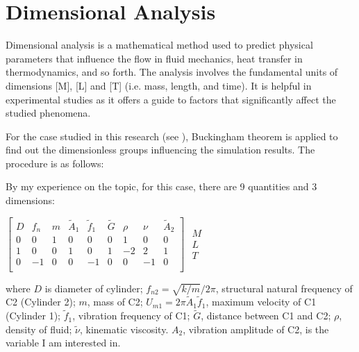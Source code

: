 
\section{Dimensional Analysis} \label{sec:nondim}

	

Dimensional analysis is a mathematical method used to predict physical parameters that influence the flow in fluid mechanics, heat transfer in thermodynamics, and so forth. The analysis involves the fundamental units of dimensions [M], [L] and [T] (i.e. mass, length, and time). It is helpful in experimental studies as it offers a guide to factors that significantly affect the studied phenomena. \cite{wiki:DimAnalysis}

For the case studied in this research (see ), Buckingham theorem is applied to find out the dimensionless groups influencing the simulation results. The procedure is as follows:

By my experience on the topic, for this case, there are 9 quantities and 3 dimensions:
	\begin{center}
		
		$\begin{bmatrix}
		D 	&  f_{n}  &  m &  \widetilde{A}_1 &  \widetilde{f}_1   &  \widetilde{G}  &  \rho   &  \nu  & \widetilde{A}_2\\  
		0	&0  			&1  	&0  			&0  		&0   &1  		&0   & 0 \\ 
		1	&0  			&0  	&1  			&0  		&1   &-2  		&2  &  1 \\
		0	&-1  			&0  	&0 			&-1 	  &0    &0  		&-1    &  0  \\
		\end{bmatrix}$
		$\begin{matrix}
		\\
		M \\
		L \\
		T \\
		\end{matrix}$
	\end{center}
where $ D $ is diameter of cylinder; $ f_{n2} =\sqrt{k/m}/2\pi $, structural natural frequency of C2 (Cylinder 2); $ m $, mass of C2; $ U_{m1}=2\pi \widetilde{A}_1 \widetilde{f}_1 $, maximum velocity of C1 (Cylinder 1); $ \widetilde{f}_1 $, vibration frequency of C1; $ \widetilde{G} $, distance between C1 and C2; $ \rho $, density of fluid; $ \widetilde{\nu} $, kinematic viscosity. $ A_{2} $, vibration amplitude of C2, is the variable I am interested in.

